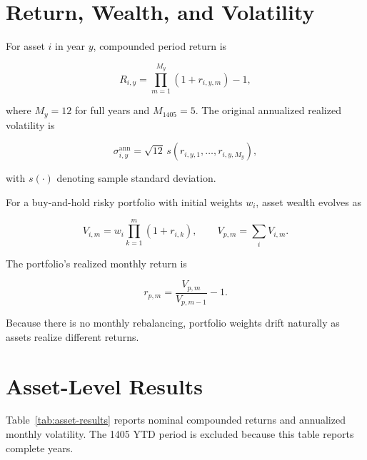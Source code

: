 \documentclass[11pt,a4paper]{article}
\begin{document}
\section{Return, Wealth, and Volatility}

For asset $i$ in year $y$, compounded period return is

\begin{equation}
R_{i,y}=\prod_{m=1}^{M_y}(1+r_{i,y,m})-1,
\end{equation}

where $M_y=12$ for full years and $M_{1405}=5$. The original annualized realized volatility is

\begin{equation}
\sigma_{i,y}^{\text{ann}}=\sqrt{12}\,s(r_{i,y,1},\ldots,r_{i,y,M_y}),
\end{equation}

with $s(\cdot)$ denoting sample standard deviation.

For a buy-and-hold risky portfolio with initial weights $w_i$, asset wealth evolves as

\begin{equation}
V_{i,m}=w_i\prod_{k=1}^{m}(1+r_{i,k}),
\qquad
V_{p,m}=\sum_i V_{i,m}.
\end{equation}

The portfolio's realized monthly return is

\begin{equation}
r_{p,m}=\frac{V_{p,m}}{V_{p,m-1}}-1.
\end{equation}

Because there is no monthly rebalancing, portfolio weights drift naturally as assets realize
different returns.

\section{Asset-Level Results}

Table~\ref{tab:asset-results} reports nominal compounded returns and annualized monthly
volatility. The 1405 YTD period is excluded because this table reports complete years.
\end{document}
